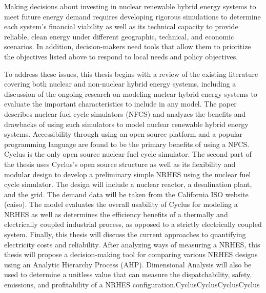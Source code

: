 \documentclass[12pt]{UIdahoMastersThesis}
\begin{document}
Making decisions about investing in nuclear renewable hybrid energy systems to meet future energy demand requires developing rigorous simulations to determine each system's financial viability as well as its technical capacity to provide reliable, clean energy under different geographic, technical, and economic scenarios. In addition, decision-makers need tools that allow them to prioritize the objectives listed above to respond to local needs and policy objectives.


To address these issues, this thesis begins with a review of the existing literature covering both nuclear and non-nuclear hybrid energy systems, including a discussion of the ongoing research on modeling nuclear hybrid energy systems to evaluate the important characteristics to include in any model. The paper describes nuclear fuel cycle simulators (NFCS) and analyzes the benefits and drawbacks of using such simulators to model nuclear renewable hybrid energy systems.  Accessibility through using an open source platform and a popular programming language are found to be the primary benefits of using a NFCS. Cyclus is the only open source nuclear fuel cycle simulator. 
The second part of the thesis uses Cyclus's open source structure as well as its flexibility and modular design to develop a preliminary simple NRHES using the nuclear fuel cycle simulator. The design will include a nuclear reactor, a desalination plant, and the grid.  The demand data will be taken from the California ISO website (caiso). The model evaluates the overall usability of Cyclus for modeling a NRHES as well as determines the efficiency benefits of a thermally and electrically coupled industrial process, as opposed to a strictly electrically coupled system. 
Finally, this thesis will discuss the current approaches to quantifying electricity costs and reliability. After analyzing ways of measuring a NRHES, this thesis will propose a decision-making tool for comparing various NRHES designs using an Analytic Hierarchy Process (AHP).  Dimensional Analysis will also be used to determine a unitless value that can measure the dispatchability, safety, emissions, and profitability of a NRHES configuration.CyclusCyclusCyclusCyclus
\end{document}

